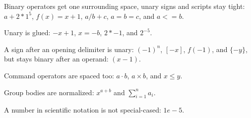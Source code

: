 Binary operators get one surrounding space, unary signs and scripts stay tight:
$a+2*1^5$, $f(x)=x+1$, $a/b+c$, $a=b=c$, and $a<=b$.

Unary is glued: $-x+1$, $x=-b$, $2*-1$, and $2^{-5}$.

A sign after an opening delimiter is unary: $(-1)^n$, $[-x]$, $f(-1)$, and
$\{-y\}$, but stays binary after an operand: $(x-1)$.

Command operators are spaced too: $a\cdot b$, $a\times b$, and $x\leq y$.

Group bodies are normalized: $x^{a+b}$ and $\sum_{i=1}^n a_i$.

A number in scientific notation is not special-cased: $1e-5$.
